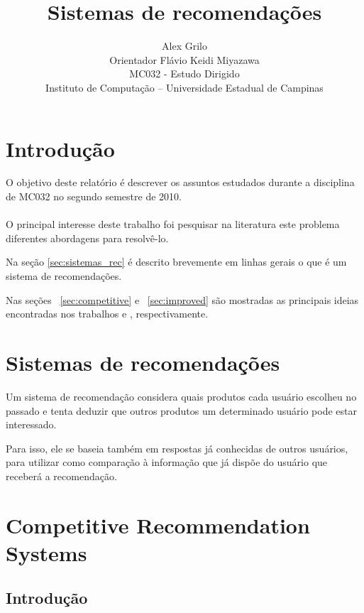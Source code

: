 \documentclass[a4paper,10pt]{article}
\title{Sistemas de recomendações}
\author{Alex Grilo \\ Orientador Flávio Keidi Miyazawa\\ MC032 - Estudo Dirigido \\ \normalsize{Instituto de Computação -- Universidade Estadual de Campinas}}
\begin{document}
\maketitle

\newpage

\tableofcontents

\newpage

\newtheorem{definicao}{Definição}
\newtheorem{lema}{Lema}
\newtheorem{coro}{Corolário}
\newtheorem{teo}{Teorema}

\nocite{golub}
\section{Introdução}

O objetivo deste relatório é descrever os assuntos estudados durante a 
disciplina de MC032 no segundo semestre de 2010.  \\ \\ 
O principal interesse deste trabalho foi pesquisar na literatura este
problema diferentes abordagens para resolvê-lo.

Na seção \ref{sec:sistemas_rec} é descrito brevemente em linhas gerais
o que é um sistema de recomendações.

Nas seções ~\ref{sec:competitive} e ~\ref{sec:improved} são mostradas as
principais ideias encontradas nos trabalhos  \cite{drineas} e \cite{baruch},
respectivamente.

\newpage

\section{Sistemas de recomendações}\label{sec:sitemas_rec}

Um sistema de recomendação considera quais produtos cada usuário
escolheu no passado e tenta deduzir que outros produtos um determinado
usuário pode estar interessado. 

Para isso, ele se baseia também em respostas já conhecidas de outros 
usuários, para utilizar como comparação à informação que já dispõe
do usuário que receberá a recomendação.

\newpage

\section{Competitive Recommendation Systems}\label{competitive}

\subsection{Introdução}
\end{document}

